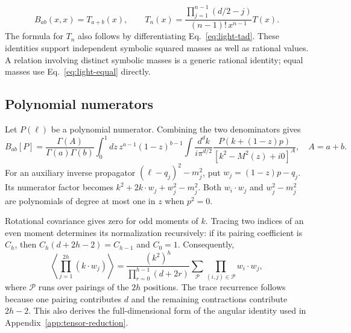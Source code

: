 \begin{equation}
 B_{ab}(x,x)=T_{a+b}(x),\qquad
 T_n(x)=\frac{\prod_{j=1}^{n-1}(d/2-j)}{(n-1)!\,x^{n-1}}T(x).
 \label{eq:light-equal}
\end{equation}
The formula for $T_n$ also follows by differentiating Eq.~\eqref{eq:light-tad}. These identities support independent symbolic squared masses as well as rational values. A relation involving distinct symbolic masses is a generic rational identity; equal masses use Eq.~\eqref{eq:light-equal} directly.

\subsection{Polynomial numerators}
Let $P(\ell)$ be a polynomial numerator. Combining the two denominators gives
\begin{equation}
 B_{ab}[P]=\frac{\Gamma(A)}{\Gamma(a)\Gamma(b)}\int_0^1 dz\,
 z^{a-1}(1-z)^{b-1}\int\frac{d^dk}{i\pi^{d/2}}
 \frac{P(k+(1-z)p)}{[k^2-M^2(z)+i0]^A},\quad A=a+b.
 \label{eq:light-parameter}
\end{equation}
For an auxiliary inverse propagator $(\ell-q_j)^2-m_j^2$, put $w_j=(1-z)p-q_j$. Its numerator factor becomes $k^2+2k\cdot w_j+w_j^2-m_j^2$. Both $w_i\cdot w_j$ and $w_j^2-m_j^2$ are polynomials of degree at most one in $z$ when $p^2=0$.

Rotational covariance gives zero for odd moments of $k$. Tracing two indices of an even moment determines its normalization recursively: if its pairing coefficient is $C_h$, then $C_h(d+2h-2)=C_{h-1}$ and $C_0=1$. Consequently,
\begin{equation}
 \left\langle\prod_{j=1}^{2h}(k\cdot w_j)\right\rangle
 =\frac{(k^2)^h}{\prod_{r=0}^{h-1}(d+2r)}
 \sum_{\mathcal P}\prod_{(i,j)\in\mathcal P}w_i\cdot w_j,
 \label{eq:light-angular}
\end{equation}
where $\mathcal P$ runs over pairings of the $2h$ positions. The trace recurrence follows because one pairing contributes $d$ and the remaining contractions contribute $2h-2$. This also derives the full-dimensional form of the angular identity used in Appendix~\ref{app:tensor-reduction}.

